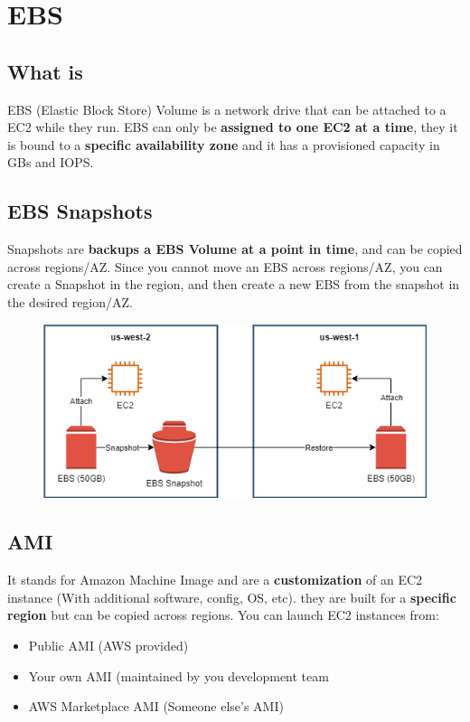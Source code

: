\section{EBS}

\subsection{What is}
EBS (Elastic Block Store) Volume is a network drive that can be attached to a EC2 while they run. EBS can only be \textbf{assigned to one EC2 at a time}, they it is bound to a \textbf{specific availability zone} and it has a provisioned capacity in GBs and IOPS.

\subsection{EBS Snapshots}
Snapshots are \textbf{backups a EBS Volume at a point in time}, and can be copied across regions/AZ. Since you cannot move an EBS across regions/AZ, you can create a Snapshot in the region, and then create a new EBS from the snapshot in the desired region/AZ.

\begin{figure}[h]
\includegraphics[scale=0.5]{ebs/ebs}
\centering
\end{figure}

\subsection{AMI}
It stands for Amazon Machine Image and are a \textbf{customization} of an EC2 instance (With additional software, config, OS, etc). they are built for a \textbf{specific region} but can be copied across regions.
You can launch EC2 instances from:
	\begin{itemize}
		\item{Public AMI (AWS provided)}
		\item{Your own AMI (maintained by you development team}
		\item{AWS Marketplace AMI (Someone else's AMI)}
	\end{itemize}

